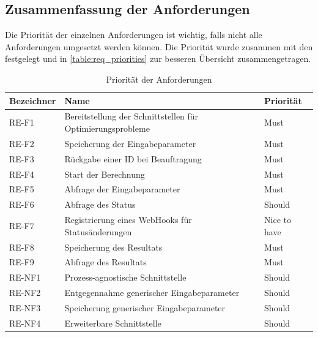 \newpage
\subsection{Zusammenfassung der Anforderungen}\label{toc_anfoderungen}
Die Priorität der einzelnen Anforderungen ist wichtig, falls nicht alle Anforderungen umgesetzt werden können. Die Priorität wurde zusammen mit den  
festgelegt und in \autoref{table:req_priorities} zur besseren Übersicht zusammengetragen.
\begin{table}[ht]
\centering
  \begin{tabular}{ l | l | l }
	\hline
	\rowcolor{gray}
	\textbf{Bezeichner}	& \textbf{Name}	&	\textbf{Priorität}\\ \hline
	RE-F1 			&  Bereitstellung der Schnittstellen für Optimierungsprobleme	& Must\\ \hline
	RE-F2 			&  Speicherung der Eingabeparameter	& Must\\ \hline
	RE-F3 			&  Rückgabe einer ID bei Beauftragung	& Must\\ \hline
	RE-F4 			&  Start der Berechnung	& Must\\ \hline
	RE-F5 			&  Abfrage der Eingabeparameter	& Must\\ \hline
	RE-F6 			&  Abfrage des Status	& Should\\ \hline
	RE-F7 			&  Registrierung eines WebHooks für Statusänderungen	& Nice to have\\ \hline
	RE-F8 			&  Speicherung des Resultats	& Must\\ \hline
	RE-F9 			&  Abfrage des Resultats	& Must\\ \hline
	RE-NF1 			&  Prozess-agnostische Schnittstelle & Should\\ \hline
	RE-NF2 			&  Entgegennahme generischer Eingabeparameter & Should\\ \hline
	RE-NF3 			&  Speicherung generischer Eingabeparameter & Should\\ \hline
	RE-NF4 			&  Erweiterbare Schnittstelle & Should\\ \hline	
  \end{tabular}
   \caption{Priorität der Anforderungen}\label{table:req_priorities}
\end{table}